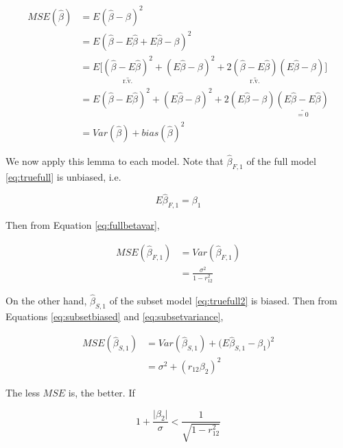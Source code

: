 \documentclass[]{book}
\theoremstyle{definition}
\theoremstyle{definition}
\theoremstyle{definition}
\theoremstyle{remark}
\begin{document}
\begin{equation}
  \begin{split}
    MSE (\hat\beta) & = E (\hat\beta - \beta)^2 \\
    & = E (\hat\beta - E\hat\beta + E\hat\beta - \beta )^2 \\
    & = E \Big[ \underset{\text{r.v.}}{\underline{( \hat\beta - E\hat\beta )^2}} + (E\hat\beta - \beta )^2 + 2 \underset{\text{r.v.}}{\underline{( \hat\beta - E\hat\beta )}} (E\hat\beta - \beta ) \Big] \\
    & = E(\hat\beta - E\hat\beta)^2 + (E\hat\beta - \beta)^2 + 2 (E\hat\beta - \beta ) \underset{= 0}{\underline{(E\hat\beta - E\hat\beta)}} \\
    & = Var(\hat\beta) + bias(\hat\beta)^2
  \end{split}
\end{equation}

We now apply this lemma to each model. Note that \(\hat\beta_{F,1}\) of the full model \eqref{eq:truefull} is unbiased, i.e.

\[E\hat\beta_{F,1} = \beta_1\]

Then from Equation \eqref{eq:fullbetavar},

\begin{equation}
  \begin{split}
    MSE(\hat\beta_{F,1}) & = Var(\hat\beta_{F,1}) \\
    & = \frac{\sigma^2}{1 - r_{12}^2}
  \end{split}
  \label{eq:truefullmse}
\end{equation}

On the other hand, \(\hat\beta_{S, 1}\) of the subset model \eqref{eq:truefull2} is biased. Then from Equations \eqref{eq:subsetbiased} and \eqref{eq:subsetvariance},

\begin{equation}
  \begin{split}
    MSE(\hat\beta_{S,1}) & = Var(\hat\beta_{S,1}) + \Big( E\hat\beta_{S,1} - \beta_1 \Big)^2 \\
    & = \sigma^2 + (r_{12} \beta_2)^2
  \end{split}
  \label{eq:truefullmse2}
\end{equation}

The less \(MSE\) is, the better. If

\begin{equation}
  1 + \frac{\lvert \beta_2 \rvert}{\sigma} < \frac{1}{\sqrt{1 - r_{12}^2}}
  \label{eq:fullmsecomp}
\end{equation}
\end{document}
